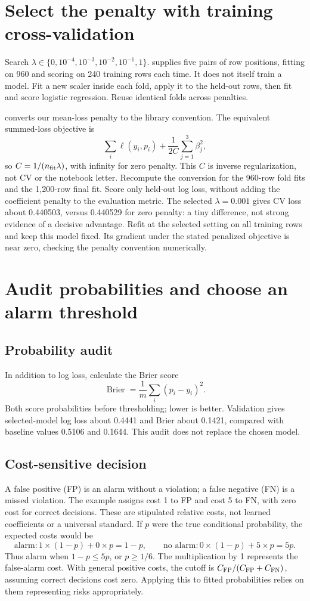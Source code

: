 \section{Select the penalty with training cross-validation}
Search $\lambda\in\{0,10^{-4},10^{-3},10^{-2},10^{-1},1\}$.  supplies five pairs of row positions, fitting on 960 and scoring on 240 training rows each time. It does not itself train a model. Fit a new scaler inside each fold, apply it to the held-out rows, then fit and score logistic regression. Reuse identical folds across penalties.

 converts our mean-loss penalty to the library convention. The equivalent summed-loss objective is
\[\sum_i\ell(y_i,p_i)+\frac1{2C}\sum_{j=1}^3\beta_j^2,\]
so $C=1/(n_{\rm fit}\lambda)$, with infinity for zero penalty. This $C$ is inverse regularization, not CV or the notebook letter. Recompute the conversion for the 960-row fold fits and the 1,200-row final fit.
Score only held-out log loss, without adding the coefficient penalty to the evaluation metric. The selected $\lambda=0.001$ gives CV loss about 0.440503, versus 0.440529 for zero penalty: a tiny difference, not strong evidence of a decisive advantage. Refit at the selected setting on all training rows and keep this model fixed. Its gradient under the stated penalized objective is near zero, checking the penalty convention numerically.

\section{Audit probabilities and choose an alarm threshold}
\subsection*{Probability audit}
In addition to log loss, calculate the Brier score
\[\operatorname{Brier}=\frac1m\sum_i(p_i-y_i)^2.\]
Both score probabilities before thresholding; lower is better. Validation gives selected-model log loss about 0.4441 and Brier about 0.1421, compared with baseline values 0.5106 and 0.1644. This audit does not replace the chosen model.

\subsection*{Cost-sensitive decision}
A false positive (FP) is an alarm without a violation; a false negative (FN) is a missed violation. The example assigns cost 1 to FP and cost 5 to FN, with zero cost for correct decisions. These are stipulated relative costs, not learned coefficients or a universal standard.
If $p$ were the true conditional probability, the expected costs would be
\[
\text{alarm}:1\times(1-p)+0\times p=1-p,
\qquad
\text{no alarm}:0\times(1-p)+5\times p=5p.
\]
Thus alarm when $1-p\le5p$, or $p\ge1/6$. The multiplication by 1 represents the false-alarm cost. With general positive costs, the cutoff is $C_{\rm FP}/(C_{\rm FP}+C_{\rm FN})$, assuming correct decisions cost zero. Applying this to fitted probabilities relies on them representing risks appropriately.

